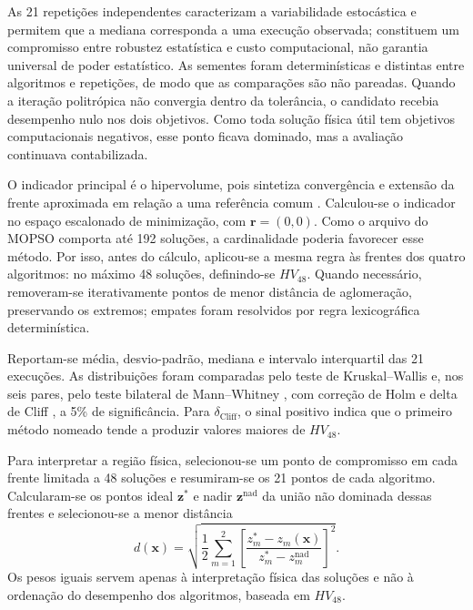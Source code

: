 \documentclass[a4paper,11pt]{article}
\begin{document}
As 21 repetições independentes caracterizam a variabilidade estocástica e
permitem que a mediana corresponda a uma execução observada; constituem um
compromisso entre robustez estatística e custo computacional, não garantia
universal de poder estatístico. As sementes foram determinísticas e distintas
entre algoritmos e repetições, de modo que as comparações são não pareadas.
Quando a iteração politrópica não convergia dentro da tolerância, o candidato
recebia desempenho nulo nos dois objetivos. Como toda solução física útil tem
objetivos computacionais negativos, esse ponto ficava dominado, mas a avaliação
continuava contabilizada.

O indicador principal é o hipervolume, pois sintetiza convergência e extensão
da frente aproximada em relação a uma referência comum \citep{zitzler1999}.
Calculou-se o indicador no espaço escalonado de minimização, com
$\mathbf{r}=(0,0)$. Como o arquivo do MOPSO comporta até 192 soluções, a
cardinalidade poderia favorecer esse método. Por isso, antes do cálculo,
aplicou-se a mesma regra às frentes dos quatro algoritmos: no máximo 48
soluções, definindo-se $HV_{48}$. Quando necessário, removeram-se
iterativamente pontos de menor distância de aglomeração, preservando os
extremos; empates foram resolvidos por regra lexicográfica determinística.

Reportam-se média, desvio-padrão, mediana e intervalo interquartil das 21
execuções. As distribuições foram comparadas pelo teste de Kruskal--Wallis
\citep{kruskal1952} e, nos seis pares, pelo teste bilateral de Mann--Whitney
\citep{mannwhitney1947}, com correção de Holm \citep{holm1979} e delta de Cliff
\citep{cliff1993}, a 5\% de significância. Para
$\delta_{\mathrm{Cliff}}$, o sinal positivo indica que o primeiro método
nomeado tende a produzir valores maiores de $HV_{48}$.

Para interpretar a região física, selecionou-se um ponto de compromisso em
cada frente limitada a 48 soluções e resumiram-se os 21 pontos de cada
algoritmo. Calcularam-se os pontos ideal $\mathbf{z}^\ast$ e nadir
$\mathbf{z}^{\mathrm{nad}}$ da união não dominada dessas frentes e
selecionou-se a menor distância
\begin{equation}
d(\mathbf{x})=
\sqrt{\frac{1}{2}\sum_{m=1}^{2}
\left[
\frac{z_m^\ast-z_m(\mathbf{x})}
{z_m^\ast-z_m^{\mathrm{nad}}}
\right]^2}.
\label{eq:compromisso}
\end{equation}
Os pesos iguais servem apenas à interpretação física das soluções e não à
ordenação do desempenho dos algoritmos, baseada em $HV_{48}$.
\end{document}
